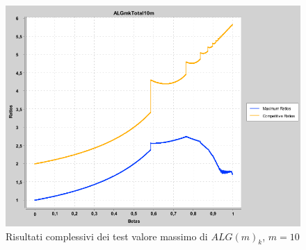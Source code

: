 \documentclass[12pt]{article}
\begin{document}
\begin{figure}[H]
\caption{Risultati complessivi dei test valore massimo di $ALG(m)_{k}$, $m = 10$}
\centering
\includegraphics[scale=0.4]{max/ALGmkTotalm10.png}
\end{figure}
\end{document}
